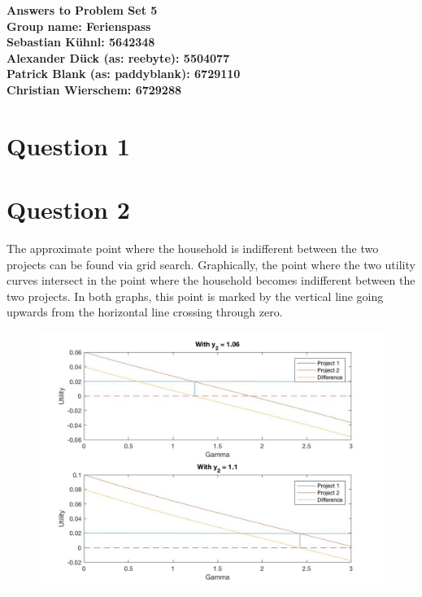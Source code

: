 \documentclass{article}
\begin{document}
\begin{center}
\LARGE \bfseries{Answers to Problem Set 5}\\
 Group name: Ferienspass\vspace{.5cm}\\
 \normalsize \normalfont
  Sebastian K\"uhnl: 5642348\\
  Alexander D\"uck (as: reebyte): 5504077\\
  Patrick Blank (as: paddyblank): 6729110\\
  Christian Wierschem: 6729288
\end{center}
\normalsize	
\section{Question 1}
% 
\section{Question 2}

The approximate point where the household is indifferent between the two projects can be found via grid search. Graphically, the point where the two utility curves intersect in the point where the household becomes indifferent between the two projects. In both graphs, this point is marked by the vertical line going upwards from the horizontal line crossing through zero.
\begin{figure}[h]
\includegraphics[width = \textwidth, keepaspectratio]{PS5Q2Sub3_Utility.jpg} 
\end{figure}
\end{document}

